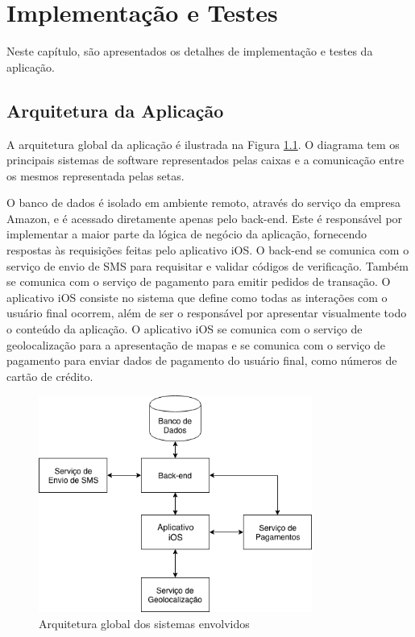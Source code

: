 \chapter{Implementação e Testes} \label{cap:development}
Neste capítulo, são apresentados os detalhes de implementação e testes da aplicação.

\section{Arquitetura da Aplicação}
A arquitetura global da aplicação é ilustrada na Figura \ref{fig:architecture}. O diagrama tem os principais sistemas de software representados pelas caixas e a comunicação entre os mesmos representada pelas setas. 

O banco de dados é isolado em ambiente remoto, através do serviço da empresa Amazon, e é acessado diretamente apenas pelo back-end. Este é responsável por implementar a maior parte da lógica de negócio da aplicação, fornecendo respostas às requisições feitas pelo aplicativo iOS. O back-end se comunica com o serviço de envio de SMS para requisitar e validar códigos de verificação. Também se comunica com o serviço de pagamento para emitir pedidos de transação. O aplicativo iOS consiste no sistema que define como todas as interações com o usuário final ocorrem, além de ser o responsável por apresentar visualmente todo o conteúdo da aplicação. O aplicativo iOS se comunica com o serviço de geolocalização para a apresentação de mapas e se comunica com o serviço de pagamento para enviar dados de pagamento do usuário final, como números de cartão de crédito.

\begin{figure}[H]
    \centering
    \includegraphics[width=0.8\textwidth]{pfc/figuras/system-architecture.png}
    \caption{Arquitetura global dos sistemas envolvidos}
    \label{fig:architecture}
\end{figure}


